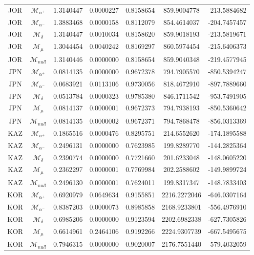 \begin{tabular}{ccccccc}
JOR & $\mathcal{M}_{\alpha^+}$ & 1.3140447 & 0.0000227 & 0.8158654 & 859.9004778 & -213.5884682\\
JOR & $\mathcal{M}_{\alpha^-}$ & 1.3883468 & 0.0000158 & 0.8112079 & 854.4614037 & -204.7457457\\
JOR & $\mathcal{M}_{\delta}$ & 1.3140447 & 0.0010034 & 0.8158620 & 859.9018193 & -213.5819671\\
JOR & $\mathcal{M}_{\mu}$ & 1.3044454 & 0.0040242 & 0.8169297 & 860.5974454 & -215.6406373\\
JOR & $\mathcal{M}_{null}$ & 1.3140446 & 0.0000000 & 0.8158654 & 859.9040348 & -219.4577945\\
JPN & $\mathcal{M}_{\alpha^+}$ & 0.0814135 & 0.0000000 & 0.9672378 & 794.7905570 & -850.5394247\\
JPN & $\mathcal{M}_{\alpha^-}$ & 0.0683921 & 0.0113106 & 0.9730056 & 818.4672910 & -897.7889660\\
JPN & $\mathcal{M}_{\delta}$ & 0.0513784 & 0.0000323 & 0.9785380 & 846.1711542 & -953.7491905\\
JPN & $\mathcal{M}_{\mu}$ & 0.0814137 & 0.0000001 & 0.9672373 & 794.7938193 & -850.5360642\\
JPN & $\mathcal{M}_{null}$ & 0.0814135 & 0.0000002 & 0.9672371 & 794.7868478 & -856.0313369\\
KAZ & $\mathcal{M}_{\alpha^+}$ & 0.1865516 & 0.0000476 & 0.8295751 & 214.6552620 & -174.1895588\\
KAZ & $\mathcal{M}_{\alpha^-}$ & 0.2496131 & 0.0000000 & 0.7623985 & 199.8289770 & -144.2825364\\
KAZ & $\mathcal{M}_{\delta}$ & 0.2390774 & 0.0000000 & 0.7721660 & 201.6233048 & -148.0605220\\
KAZ & $\mathcal{M}_{\mu}$ & 0.2362297 & 0.0000001 & 0.7769984 & 202.2588602 & -149.9899724\\
KAZ & $\mathcal{M}_{null}$ & 0.2496130 & 0.0000001 & 0.7624011 & 199.8317347 & -148.7833403\\
KOR & $\mathcal{M}_{\alpha^+}$ & 0.6920979 & 0.0649634 & 0.9155851 & 2216.2272046 & -646.0307164\\
KOR & $\mathcal{M}_{\alpha^-}$ & 0.8387203 & 0.0000073 & 0.8985858 & 2168.9233801 & -556.4976910\\
KOR & $\mathcal{M}_{\delta}$ & 0.6985206 & 0.0000000 & 0.9123594 & 2202.6982338 & -627.7305826\\
KOR & $\mathcal{M}_{\mu}$ & 0.6614961 & 0.2464106 & 0.9192266 & 2224.9307739 & -667.5495675\\
KOR & $\mathcal{M}_{null}$ & 0.7946315 & 0.0000000 & 0.9020007 & 2176.7551440 & -579.4032059\\

\end{tabular}
